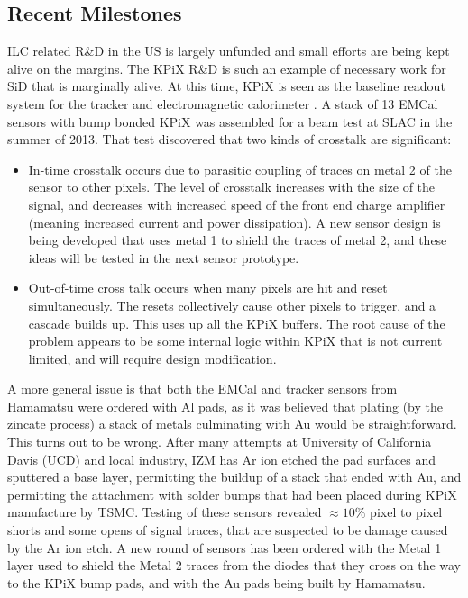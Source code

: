 \subsection{Recent Milestones}
ILC related R\&D in the US is largely unfunded and small efforts are being kept alive on the margins. The KPiX R\&D is such an example of necessary work for SiD that is marginally alive.
At this time, KPiX is seen as the baseline readout system for the tracker and electromagnetic calorimeter .  A stack of 13 EMCal sensors with bump bonded KPiX was assembled for a beam test at SLAC in the summer of 2013. That test discovered that two kinds of crosstalk are significant:
\begin{itemize}
	\item In-time crosstalk occurs due to parasitic coupling of traces on metal 2 of the sensor to other pixels. The level of crosstalk increases with the size of the signal, and decreases with increased speed of the front end charge amplifier (meaning increased current and power dissipation).  A new sensor design is being developed that uses metal 1 to shield the traces of metal 2, and these ideas will be tested in the next sensor prototype.
	\item Out-of-time cross talk occurs when many pixels are hit and reset simultaneously. The resets collectively cause other pixels to trigger, and a cascade builds up. This uses up all the KPiX buffers. The root cause of the problem appears to be some internal logic within KPiX that is not current limited, and will require design modification.
\end{itemize}
A more general issue is that both the EMCal and tracker sensors from Hamamatsu were ordered with Al pads, as it was believed that plating (by the zincate process) a stack of metals culminating with Au would be straightforward. This turns out to be wrong. After many attempts at University of California Davis (UCD) and local industry, IZM  has Ar ion etched the pad surfaces and sputtered a base layer, permitting the buildup of a stack that ended with Au, and permitting the attachment with solder bumps that had been placed during KPiX manufacture by TSMC. Testing of these sensors revealed $\approx 10\%$ pixel to pixel shorts and some opens of signal traces, that are suspected to be damage caused by the Ar ion etch. A new round of sensors has been ordered with the Metal 1 layer used to shield the Metal 2 traces from the diodes that they cross on the way to the KPiX bump pads, and with the Au pads being built by Hamamatsu.

